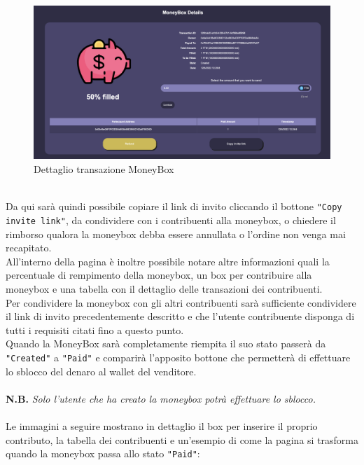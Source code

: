             \begin{figure}[H]
                \centering
                \includegraphics[scale=0.2]{immagini/Checkout/MoneyBoxDetails.png}
                \caption{Dettaglio transazione MoneyBox}
            \end{figure}
            \textbf{}\\
            Da qui sarà quindi possibile copiare il link di invito cliccando il bottone \texttt{"Copy invite link"}, da condividere con i contribuenti alla moneybox, o chiedere il rimborso qualora la moneybox debba essere annullata o l'ordine non venga mai recapitato.\\
            All'interno della pagina è inoltre possibile notare altre informazioni quali la percentuale di rempimento della moneybox, un box per contribuire alla moneybox e una tabella con il dettaglio delle transazioni dei contribuenti.\\
            Per condividere la moneybox con gli altri contribuenti sarà sufficiente condividere il link di invito precedentemente descritto e che l'utente contribuente disponga di tutti i requisiti citati fino a questo punto.\\
            Quando la MoneyBox sarà completamente riempita il suo stato passerà da \texttt{"Created"} a \texttt{"Paid"} e comparirà l'apposito bottone che permetterà di effettuare lo sblocco del denaro al wallet del venditore.\\\\ 
            \textbf{N.B.} \textit{Solo l'utente che ha creato la moneybox potrà effettuare lo sblocco.}\\\\
            Le immagini a seguire mostrano in dettaglio il box per inserire il proprio contributo, la tabella dei contribuenti e un'esempio di come la pagina si trasforma quando la moneybox passa allo stato \texttt{"Paid"}:
